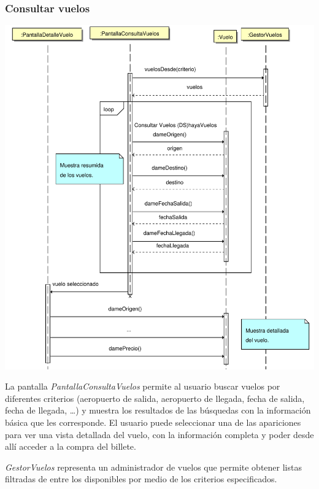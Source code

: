 \documentclass[11pt, a4paper, twoside, titlepage]{article}
\begin{document}
			\subsubsection{Consultar vuelos}
				\begin{center}
					\includegraphics[scale=.75]{diseno/diagramas/consultarvuelos.pdf}
				\end{center}

				La pantalla {\itshape PantallaConsultaVuelos} permite al usuario buscar vuelos por diferentes criterios (aeropuerto de salida, aeropuerto de llegada, fecha de salida, fecha de llegada, \ldots) y muestra los resultados de las búsquedas con la información básica que les corresponde. El usuario puede seleccionar una de las apariciones para ver una vista detallada del vuelo, con la información completa y poder desde allí acceder a la compra del billete.

				{\itshape GestorVuelos} representa un administrador de vuelos que permite obtener listas filtradas de entre los disponibles por medio de los criterios especificados.
			
\end{document}
